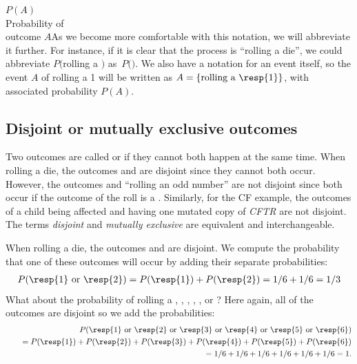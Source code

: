 \begin{doublespace}
{$P(A)$\vspace{1mm}\\\footnotesize Probability of\\outcome $A$}As we become more comfortable with this notation, we will abbreviate it further. For instance, if it is clear that the process is ``rolling a die'', we could abbreviate $P($rolling a $)$ as~$P($$)$.  We also have a notation for an event itself, so the event $A$ of rolling a 1 will be written as $A = \{\text{rolling a \resp{1}}\}$, with associated probability $P(A)$. 


\newpage

\subsection{Disjoint or mutually exclusive outcomes}


Two outcomes are called  or  if they cannot both happen at the same time. When rolling a die, the outcomes  and  are disjoint since they cannot both occur.  However, the outcomes  and ``rolling an odd number'' are not disjoint since both occur if the outcome of the roll is a . Similarly, for the CF example, the outcomes of a child being affected and having one mutated copy of \textit{CFTR} are not disjoint. The terms \emph{disjoint} and \emph{mutually exclusive} are equivalent and interchangeable. 

When rolling a die, the outcomes  and  are disjoint. We compute the probability that one of these outcomes will occur by adding their separate probabilities:
\begin{eqnarray*}
P(\text{\resp{1} or \resp{2}}) = P(\text{\resp{1}})+P(\text{\resp{2}}) = 1/6 + 1/6 = 1/3
\end{eqnarray*}
What about  the probability of rolling a , , , , , or ? Here again, all of the outcomes are disjoint so we add the probabilities:
\begin{eqnarray*}
&&P(\text{\resp{1} or \resp{2} or \resp{3} or \resp{4} or \resp{5} or \resp{6}}) \\
	&&\quad= P(\text{\resp{1}})+P(\text{\resp{2}})+P(\text{\resp{3}})+P(\text{\resp{4}})+P(\text{\resp{5}})+P(\text{\resp{6}}) \\
	&&\quad= 1/6 + 1/6 + 1/6 + 1/6 + 1/6 + 1/6 = 1.
\end{eqnarray*}


\end{doublespace}
